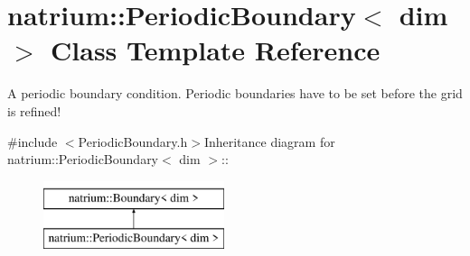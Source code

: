 \hypertarget{classnatrium_1_1PeriodicBoundary}{
\section{natrium::PeriodicBoundary$<$ dim $>$ Class Template Reference}
\label{classnatrium_1_1PeriodicBoundary}
}


A periodic boundary condition. Periodic boundaries have to be set before the grid is refined!  


{\ttfamily \#include $<$PeriodicBoundary.h$>$}Inheritance diagram for natrium::PeriodicBoundary$<$ dim $>$::\begin{figure}[H]
\begin{center}
\leavevmode
\includegraphics[height=2cm]{classnatrium_1_1PeriodicBoundary}
\end{center}
\end{figure}
